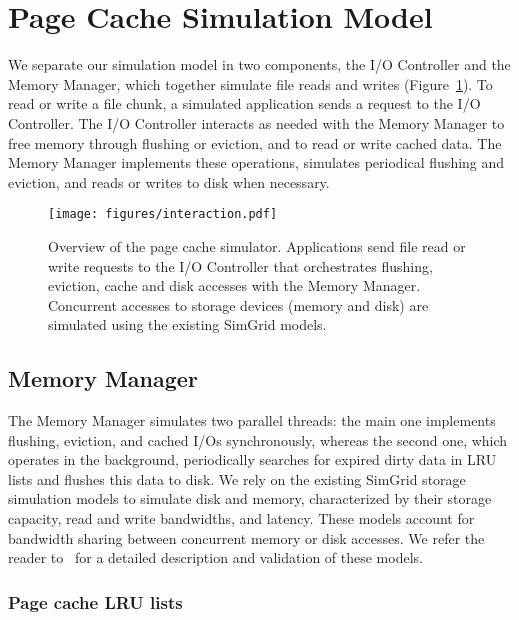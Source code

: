 \documentclass[conference]{IEEEtran}
\begin{document}
    \section{Page Cache Simulation Model}
    \label{method}

    We separate our simulation model in two components, the I/O
    Controller and the Memory Manager, which together simulate
    file reads and writes (Figure~\ref{fig:interaction}).
    To read or write a file chunk, a simulated application sends a
    request to the I/O Controller. The I/O Controller interacts as needed with
    the Memory Manager to free memory through flushing or eviction,
    and to read or write cached data. The Memory Manager
    implements these operations, simulates periodical flushing
    and eviction, and reads or writes to disk when necessary.

    \begin{figure}
           \centering
           \texttt{[image: figures/interaction.pdf]}
           \caption{Overview of the page cache simulator.
           Applications send file read or write requests to the
           I/O Controller that orchestrates flushing, eviction, cache
           and disk accesses with the Memory Manager. Concurrent accesses to storage
           devices (memory and disk) are simulated using the existing SimGrid models.}
           \label{fig:interaction}
    \end{figure}

    \subsection{Memory Manager}

    The Memory Manager simulates two parallel threads: the main one
    implements flushing, eviction, and cached I/Os synchronously, whereas
    the second one, which operates in the background, periodically searches for
    expired dirty data in LRU lists and flushes this data to disk. We
    rely on the existing SimGrid storage simulation models to simulate disk and
    memory, characterized by their storage capacity, read and write
    bandwidths, and latency. These models account for bandwidth sharing
    between concurrent memory or disk accesses. We refer the reader to~\cite{lebre2015} for a
    detailed description and validation of these models.

    \subsubsection{Page cache LRU lists}
\end{document}
